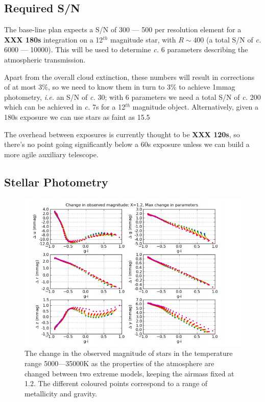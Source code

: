 \documentclass[12pt]{article}
\renewcommand{\c}{\textit{c.}\xspace}
\newcommand{\ie}{\textit{i.e.}\xspace}
\newcommand{\XXX}[1]{\textbf{XXX #1}\xspace}
\begin{document}
\subsection{Required S/N}

The base-line plan expects a S/N of 300 --- 500 per resolution element for a \XXX{180s} integration on a
12$^{th}$ magnitude star, with $R \sim 400$ (a total S/N of \c 6000 --- 10000).  This will be used to
determine \c 6 parameters describing the atmospheric transmission.

Apart from the overall cloud extinction, these numbers will result in corrections of at most 3\%, so we need
to know them in turn to 3\% to achieve 1mmag photometry, \ie an S/N of \c 30; with 6 parameters we
need a total S/N of \c 200 which can be achieved in \c 7s for a 12$^{th}$ magnitude object.  Alternatively,
given a 180s exposure we can use stars as faint as 15.5

The overhead between exposures is currently thought to be \XXX{120s}, so there's no point going significantly
below a 60s exposure unless we can build a more agile auxiliary telescope.

\subsection{Stellar Photometry}
\label{secStellarPhotometry}

\begin{figure}
\begin{center}
\includegraphics[width=14cm]{maxAtmosphereDeltas}
\end{center}
\caption{
  \label{figMaxAtmosphereDeltas}
  The change in the observed magnitude of stars in the temperature range 5000---35000K as the properties
  of the atmosphere are changed between two extreme models, keeping the airmass fixed at 1.2.  The different
  coloured points correspond to a range of metallicity and gravity.
  }
\end{figure}
\end{document}
